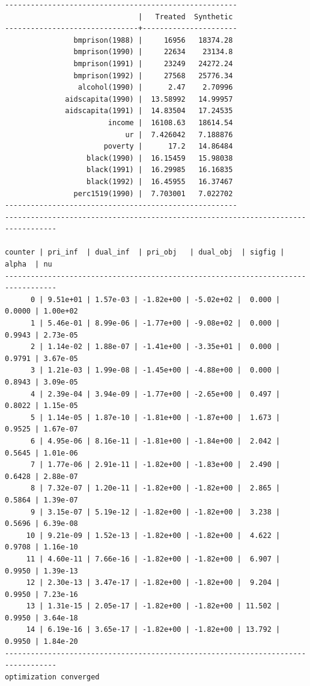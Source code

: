 \documentclass[
]{book}
\begin{document}
\begin{verbatim}
------------------------------------------------------
                               |   Treated  Synthetic 
-------------------------------+----------------------
                bmprison(1988) |     16956   18374.28 
                bmprison(1990) |     22634    23134.8 
                bmprison(1991) |     23249   24272.24 
                bmprison(1992) |     27568   25776.34 
                 alcohol(1990) |      2.47    2.70996 
              aidscapita(1990) |  13.58992   14.99957 
              aidscapita(1991) |  14.83504   17.24535 
                        income |  16108.63   18614.54 
                            ur |  7.426042   7.188876 
                       poverty |      17.2   14.86484 
                   black(1990) |  16.15459   15.98038 
                   black(1991) |  16.29985   16.16835 
                   black(1992) |  16.45955   16.37467 
                perc1519(1990) |  7.703001   7.022702 
------------------------------------------------------
----------------------------------------------------------------------------------

counter | pri_inf  | dual_inf  | pri_obj   | dual_obj  | sigfig | alpha  | nu 
----------------------------------------------------------------------------------
      0 | 9.51e+01 | 1.57e-03 | -1.82e+00 | -5.02e+02 |  0.000 | 0.0000 | 1.00e+02
      1 | 5.46e-01 | 8.99e-06 | -1.77e+00 | -9.08e+02 |  0.000 | 0.9943 | 2.73e-05
      2 | 1.14e-02 | 1.88e-07 | -1.41e+00 | -3.35e+01 |  0.000 | 0.9791 | 3.67e-05
      3 | 1.21e-03 | 1.99e-08 | -1.45e+00 | -4.88e+00 |  0.000 | 0.8943 | 3.09e-05
      4 | 2.39e-04 | 3.94e-09 | -1.77e+00 | -2.65e+00 |  0.497 | 0.8022 | 1.15e-05
      5 | 1.14e-05 | 1.87e-10 | -1.81e+00 | -1.87e+00 |  1.673 | 0.9525 | 1.67e-07
      6 | 4.95e-06 | 8.16e-11 | -1.81e+00 | -1.84e+00 |  2.042 | 0.5645 | 1.01e-06
      7 | 1.77e-06 | 2.91e-11 | -1.82e+00 | -1.83e+00 |  2.490 | 0.6428 | 2.88e-07
      8 | 7.32e-07 | 1.20e-11 | -1.82e+00 | -1.82e+00 |  2.865 | 0.5864 | 1.39e-07
      9 | 3.15e-07 | 5.19e-12 | -1.82e+00 | -1.82e+00 |  3.238 | 0.5696 | 6.39e-08
     10 | 9.21e-09 | 1.52e-13 | -1.82e+00 | -1.82e+00 |  4.622 | 0.9708 | 1.16e-10
     11 | 4.60e-11 | 7.66e-16 | -1.82e+00 | -1.82e+00 |  6.907 | 0.9950 | 1.39e-13
     12 | 2.30e-13 | 3.47e-17 | -1.82e+00 | -1.82e+00 |  9.204 | 0.9950 | 7.23e-16
     13 | 1.31e-15 | 2.05e-17 | -1.82e+00 | -1.82e+00 | 11.502 | 0.9950 | 3.64e-18
     14 | 6.19e-16 | 3.65e-17 | -1.82e+00 | -1.82e+00 | 13.792 | 0.9950 | 1.84e-20
----------------------------------------------------------------------------------
optimization converged
\end{verbatim}
\end{document}

